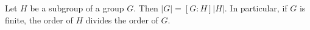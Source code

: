 \begin{theorem}
Let $H$ be a subgroup of a group $G$. Then $|G| = [G:H]|H|$. In particular, if $G$ is finite, the order of $H$ divides the order of $G$.
\end{theorem}
